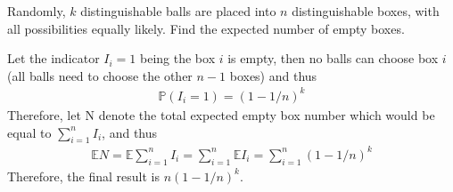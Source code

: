 
\setcounter{theorem}{33}
\begin{exercise} [BH.4.34] Randomly, $k$ distinguishable balls are placed into $n$ distinguishable boxes, with all possibilities equally likely. Find the expected number of empty boxes.
\begin{solution}
    Let the indicator $I_i=1$ being the box $i$ is empty, then no balls can choose box $i$ (all balls need to choose the other $n-1$ boxes) and thus 
	\begin{align*}
		\mathbb{P}(I_i=1) = (1-1/n)^k
	\end{align*}
	Therefore, let N denote the total expected empty box number which would be equal to $\sum_{i=1}^n I_i$, and thus   
	\begin{align*}
		\mathbb{E}N=\mathbb{E} \sum_{i=1}^n I_i =\sum_{i=1}^n \mathbb{E} I_i=\sum_{i=1}^n   (1-1/n)^k
	\end{align*}
	Therefore, the final result is 
	$ n(1-1/n)^k$.
\end{solution}
\end{exercise}

